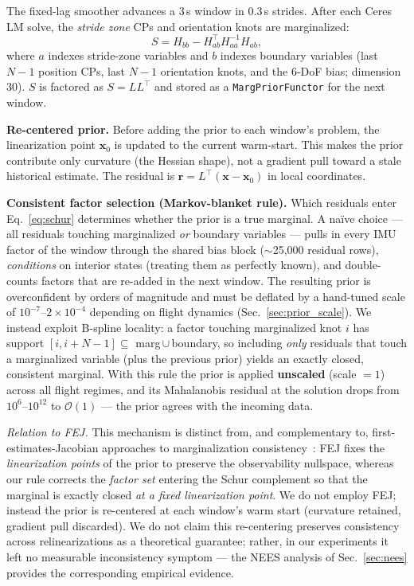 \documentclass[conference]{IEEEtran}
\begin{document}
The fixed-lag smoother advances a 3\,s window in 0.3\,s strides.
After each Ceres LM solve, the \emph{stride zone} CPs and orientation
knots are marginalized:
\begin{equation}
  S = H_{bb} - H_{ab}^{\top} H_{aa}^{-1} H_{ab},
  \label{eq:schur}
\end{equation}
where $a$ indexes stride-zone variables and $b$ indexes boundary
variables (last $N{-}1$ position CPs, last $N{-}1$ orientation
knots, and the 6-DoF bias; dimension 30).  $S$ is factored as
$S = LL^{\top}$ and stored as a \texttt{MargPriorFunctor} for the
next window.

\textbf{Re-centered prior.}
Before adding the prior to each window's problem, the linearization
point $\mathbf{x}_0$ is updated to the current warm-start.  This
makes the prior contribute only curvature (the Hessian shape), not a
gradient pull toward a stale historical estimate.  The residual is
$\mathbf{r} = L^{\top}(\mathbf{x} - \mathbf{x}_0)$ in local
coordinates.

\textbf{Consistent factor selection (Markov-blanket rule).}
Which residuals enter Eq.~\eqref{eq:schur} determines whether the
prior is a true marginal.  A na\"ive choice --- all residuals touching
marginalized \emph{or} boundary variables --- pulls in every IMU factor
of the window through the shared bias block ($\sim$25{,}000 residual
rows), \emph{conditions} on interior states (treating them as perfectly
known), and double-counts factors that are re-added in the next window.
The resulting prior is overconfident by orders of magnitude and must be
deflated by a hand-tuned scale of $10^{-7}$--$2{\times}10^{-4}$
depending on flight dynamics (Sec.~\ref{sec:prior_scale}).
We instead exploit B-spline locality: a factor touching marginalized
knot $i$ has support $[i, i{+}N{-}1] \subseteq$
marg\,$\cup$\,boundary, so including \emph{only} residuals that touch a
marginalized variable (plus the previous prior) yields an exactly
closed, consistent marginal.  With this rule the prior is applied
\textbf{unscaled} (scale $=1$) across all flight regimes, and its
Mahalanobis residual at the solution drops from $10^{6}$--$10^{12}$
to $\mathcal{O}(1)$ --- the prior agrees with the incoming data.

\emph{Relation to FEJ.}  This mechanism is distinct from, and
complementary to, first-estimates-Jacobian approaches to
marginalization consistency~\cite{dongsi2012consistency}: FEJ fixes
the \emph{linearization points} of the prior to preserve the
observability nullspace, whereas our rule corrects the
\emph{factor set} entering the Schur complement so that the marginal
is exactly closed \emph{at a fixed linearization point}.  We do not
employ FEJ; instead the prior is re-centered at each window's warm
start (curvature retained, gradient pull discarded).  We do not claim
this re-centering preserves consistency across relinearizations as a
theoretical guarantee; rather, in our experiments it left no measurable
inconsistency symptom --- the NEES analysis of
Sec.~\ref{sec:nees} provides the corresponding empirical evidence.
\end{document}
